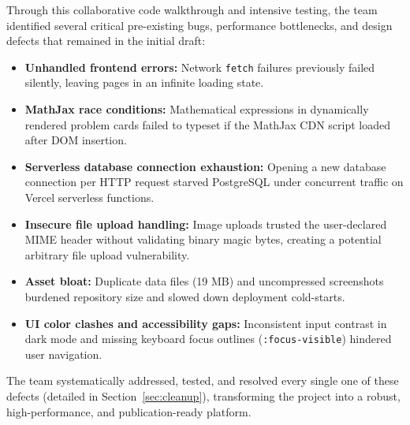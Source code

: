 Through this collaborative code walkthrough and intensive testing, the team identified several critical
pre-existing bugs, performance bottlenecks, and design defects that remained in the initial draft:
\begin{itemize}
  \item \textbf{Unhandled frontend errors:} Network \texttt{fetch} failures previously failed silently,
        leaving pages in an infinite loading state.
  \item \textbf{MathJax race conditions:} Mathematical expressions in dynamically rendered problem cards failed
        to typeset if the MathJax CDN script loaded after DOM insertion.
  \item \textbf{Serverless database connection exhaustion:} Opening a new database connection per HTTP request
        starved PostgreSQL under concurrent traffic on Vercel serverless functions.
  \item \textbf{Insecure file upload handling:} Image uploads trusted the user-declared MIME header without
        validating binary magic bytes, creating a potential arbitrary file upload vulnerability.
  \item \textbf{Asset bloat:} Duplicate data files (19 MB) and uncompressed screenshots burdened repository size
        and slowed down deployment cold-starts.
  \item \textbf{UI color clashes and accessibility gaps:} Inconsistent input contrast in dark mode and missing
        keyboard focus outlines (\texttt{:focus-visible}) hindered user navigation.
\end{itemize}
The team systematically addressed, tested, and resolved every single one of these defects (detailed in
Section~\ref{sec:cleanup}), transforming the project into a robust, high-performance, and publication-ready
platform.

